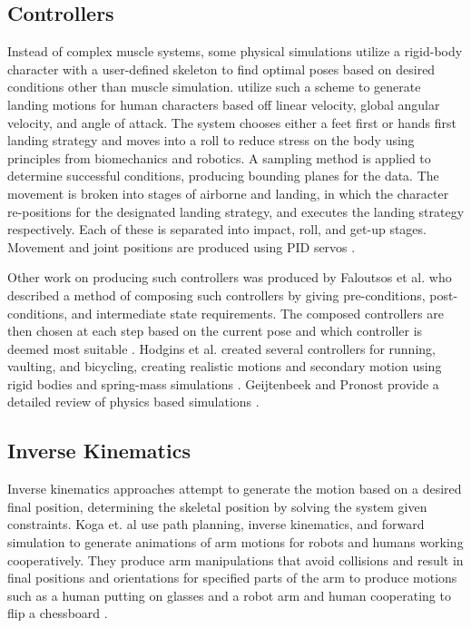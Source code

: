 \subsection{Controllers}
Instead of complex muscle systems, some physical simulations utilize a rigid-body character with a user-defined skeleton to find optimal poses based on desired conditions other than muscle simulation.  \liufall{} utilize such a scheme to generate landing motions for human characters based off linear velocity, global angular velocity, and angle of attack.  The system chooses either a feet first or hands first landing strategy and moves into a roll to reduce stress on the body using principles from biomechanics and robotics.  A sampling method is applied to determine successful conditions, producing bounding planes for the data.  The movement is broken into stages of airborne and landing, in which the character re-positions for the designated landing strategy, and executes the landing strategy respectively. Each of these is separated into impact, roll, and get-up stages.  Movement and joint positions are produced using PID servos \cite{falling_landing}.  

Other work on producing such controllers was produced by Faloutsos et al. who described a method of composing such controllers by giving pre-conditions, post-conditions, and intermediate state requirements.  The composed controllers are then chosen at each step based on the current pose and which controller is deemed most suitable \cite{composable_controllers}.  Hodgins et al. created several controllers for running, vaulting, and bicycling, creating realistic motions and secondary motion using rigid bodies and spring-mass simulations \cite{anim_human_athletics}.  Geijtenbeek and Pronost provide a detailed review of physics based simulations \cite{inter_physics_anim}.

\subsection{Inverse Kinematics}
Inverse kinematics approaches attempt to generate the motion based on a desired final position, determining the skeletal position by solving the system given constraints.  Koga et. al use path planning, inverse kinematics, and forward simulation to generate animations of arm motions for robots and humans working cooperatively.  They produce arm manipulations that avoid collisions and result in final positions and orientations for specified parts of the arm to produce motions such as a human putting on glasses and a robot arm and human cooperating to flip a chessboard \cite{motion_intentions}.  


